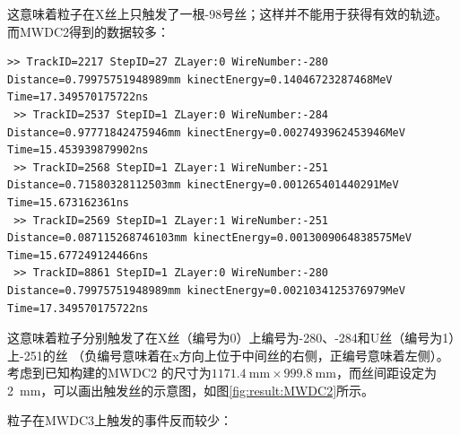 \documentclass[bachelor,openany,oneside,color]{buaathesis}
\begin{document}
这意味着粒子在X丝上只触发了一根-98号丝；这样并不能用于获得有效的轨迹。
而MWDC2得到的数据较多：

\begin{lstlisting}[caption={MWDC2},firstnumber=3760,lastline=3768]
 >> TrackID=2217 StepID=27 ZLayer:0 WireNumber:-280 Distance=0.79975751948989mm kinectEnergy=0.14046723287468MeV Time=17.349570175722ns
 >> TrackID=2537 StepID=1 ZLayer:0 WireNumber:-284 Distance=0.97771842475946mm kinectEnergy=0.0027493962453946MeV Time=15.453939879902ns
 >> TrackID=2568 StepID=1 ZLayer:1 WireNumber:-251 Distance=0.71580328112503mm kinectEnergy=0.001265401440291MeV Time=15.673162361ns
 >> TrackID=2569 StepID=1 ZLayer:1 WireNumber:-251 Distance=0.087115268746103mm kinectEnergy=0.0013009064838575MeV Time=15.677249124466ns
 >> TrackID=8861 StepID=1 ZLayer:0 WireNumber:-280 Distance=0.79975751948989mm kinectEnergy=0.0021034125376979MeV Time=17.349570175722ns
\end{lstlisting}

这意味着粒子分别触发了在X丝（编号为0）上编号为-280、-284和U丝（编号为1）上-251的丝
（负编号意味着在x方向上位于中间丝的右侧，正编号意味着左侧）。考虑到已知构建的MWDC2
的尺寸为$\SI{1171.4}{\milli\meter}\times\SI{999.8}{\milli\meter}$，而丝间距设定为
\SI{2}{\milli\meter}，可以画出触发丝的示意图，如图\ref{fig:result:MWDC2}所示。

%
%
粒子在MWDC3上触发的事件反而较少：
\end{document}
